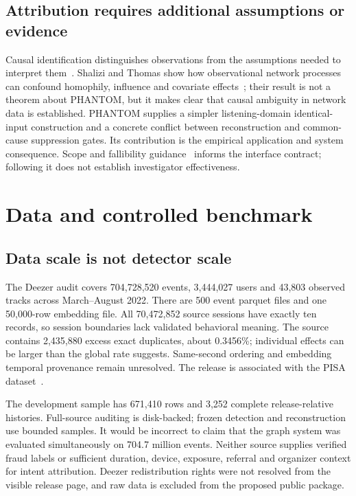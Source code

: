 \documentclass[sigconf,nonacm]{acmart}
\begin{document}
\subsection{Attribution requires additional assumptions or evidence}
Causal identification distinguishes observations from the assumptions needed to interpret them~\cite{pearl}. Shalizi and Thomas show how observational network processes can confound homophily, influence and covariate effects~\cite{shalizi}; their result is not a theorem about PHANTOM, but it makes clear that causal ambiguity in network data is established. PHANTOM supplies a simpler listening-domain identical-input construction and a concrete conflict between reconstruction and common-cause suppression gates. Its contribution is the empirical application and system consequence. Scope and fallibility guidance~\cite{amershi} informs the interface contract; following it does not establish investigator effectiveness.

\section{Data and controlled benchmark}
\subsection{Data scale is not detector scale}
The Deezer audit covers 704,728,520 events, 3,444,027 users and 43,803 observed tracks across March--August 2022. There are 500 event parquet files and one 50,000-row embedding file. All 70,472,852 source sessions have exactly ten records, so session boundaries lack validated behavioral meaning. The source contains 2,435,880 excess exact duplicates, about 0.3456\%; individual effects can be larger than the global rate suggests. Same-second ordering and embedding temporal provenance remain unresolved. The release is associated with the PISA dataset~\cite{deezerdata}.

The development sample has 671,410 rows and 3,252 complete release-relative histories. Full-source auditing is disk-backed; frozen detection and reconstruction use bounded samples. It would be incorrect to claim that the graph system was evaluated simultaneously on 704.7 million events. Neither source supplies verified fraud labels or sufficient duration, device, exposure, referral and organizer context for intent attribution. Deezer redistribution rights were not resolved from the visible release page, and raw data is excluded from the proposed public package.
\end{document}
